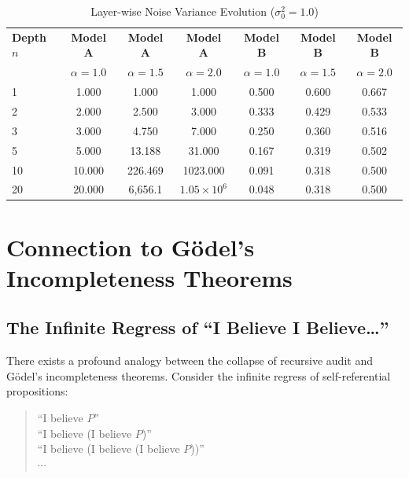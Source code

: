 \documentclass[12pt,a4paper]{article}
\theoremstyle{definition}
\begin{document}
\begin{table}[htbp]
\centering
\caption{Layer-wise Noise Variance Evolution ($\sigma_0^2 = 1.0$)}
\label{tab:layer_noise}
\begin{tabular}{@{}lcccccc@{}}
\toprule
\textbf{Depth $n$} & \textbf{Model A} & \textbf{Model A} & \textbf{Model A} & \textbf{Model B} & \textbf{Model B} & \textbf{Model B} \\
                 & $\alpha{=}1.0$ & $\alpha{=}1.5$ & $\alpha{=}2.0$ & $\alpha{=}1.0$ & $\alpha{=}1.5$ & $\alpha{=}2.0$ \\
\midrule
1  & 1.000 & 1.000 & 1.000 & 0.500 & 0.600 & 0.667 \\
2  & 2.000 & 2.500 & 3.000 & 0.333 & 0.429 & 0.533 \\
3  & 3.000 & 4.750 & 7.000 & 0.250 & 0.360 & 0.516 \\
5  & 5.000 & 13.188 & 31.000 & 0.167 & 0.319 & 0.502 \\
10 & 10.000 & 226.469 & 1023.000 & 0.091 & 0.318 & 0.500 \\
20 & 20.000 & 6{,}656.1 & $1.05{\times}10^6$ & 0.048 & 0.318 & 0.500 \\
\bottomrule
\end{tabular}
\end{table}

\section{Connection to G\"{o}del's Incompleteness Theorems}

\subsection{The Infinite Regress of ``I Believe I Believe\ldots''}

\noindent
There exists a profound analogy between the collapse of recursive audit and G\"{o}del's incompleteness theorems. Consider the infinite regress of self-referential propositions:

\begin{quote}
    ``I believe $P$'' \\
    ``I believe (I believe $P$)'' \\
    ``I believe (I believe (I believe $P$))'' \\
    $\cdots$
\end{quote}
\end{document}
